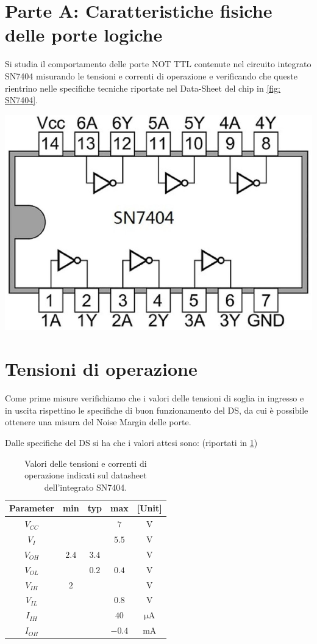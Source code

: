 \documentclass[10pt, a4paper, italian]{article}
\begin{document}
\section*{Parte A: Caratteristiche fisiche delle porte logiche}
Si studia il comportamento delle porte NOT TTL contenute nel circuito integrato SN7404 misurando le tensioni e correnti di operazione e verificando che queste rientrino nelle specifiche tecniche riportate nel Data-Sheet del chip in \cref{fig: SN7404}.
\begin{minipage}{0.3\textwidth}
    \includegraphics[width=\textwidth]{SN7404}
    
    \label{fig: SN7404}
\end{minipage}

\section{Tensioni di operazione}\label{sec: tens}
Come prime misure verifichiamo che i valori delle tensioni di soglia in
ingresso e in uscita rispettino le specifiche di buon funzionamento del DS,
da cui è possibile ottenere una misura del Noise Margin delle porte.

Dalle specifiche del DS si ha che i valori attesi sono: (riportati in
\cref{tab: notDS})
\begin{table}[htb]
\centering
\begin{tabular}{cccc|c}
\toprule
Parameter  & min & typ & max & [Unit] \\
\midrule
\midrule
$V_{CC}$ &  &  & $7$ & V \\
$V_I$	 &  &  & $5.5$ & V\\
$V_{OH}$ & $2.4$  & $3.4$ & & V \\
$V_{OL}$ &   & $0.2$ & $0.4$ & V \\
$V_{IH}$ & $2$  &  & & V  \\
$V_{IL}$ &  &  & $0.8$ & V \\
$I_{IH}$ &  &  & $40$ & $\si{\micro\A}$ \\
$I_{OH}$ &  &  & $-0.4$ & mA \\
\bottomrule 
\end{tabular}
\caption{Valori delle tensioni e correnti di operazione indicati sul
datasheet dell'integrato SN7404.}
\label{tab: notDS}
\end{table}
\end{document}
